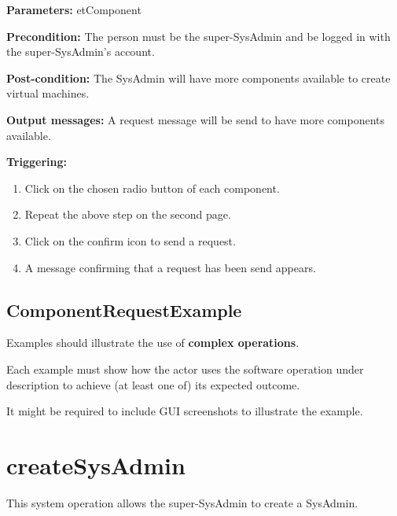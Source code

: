 \begin{description}

\item \textbf{Parameters:} etComponent
\item \textbf{Precondition:} The person must be the super-SysAdmin and be logged
in with the super-SysAdmin's account.
\item \textbf{Post-condition:} The SysAdmin will have more components
available to create virtual machines.
\item \textbf{Output messages:} A request message will be send to have more
components available.

\item \textbf{Triggering:}
\begin{enumerate}
\item Click on the chosen radio button of each component.
\item Repeat the above step on the second page.
\item Click on the confirm icon to send a request.
\item A message confirming that a request has been send appears.
\end{enumerate}

 
\end{description}

\subsection{ComponentRequestExample}
Examples should illustrate the use of \textbf{complex operations}.

Each example must show how the actor uses the software operation under
description to achieve (at least one of) its expected outcome.

It might be required to include GUI screenshots to illustrate the example.




\section{createSysAdmin}
\label{operation:createSysAdmin}
This system operation allows the super-SysAdmin to create a SysAdmin.

